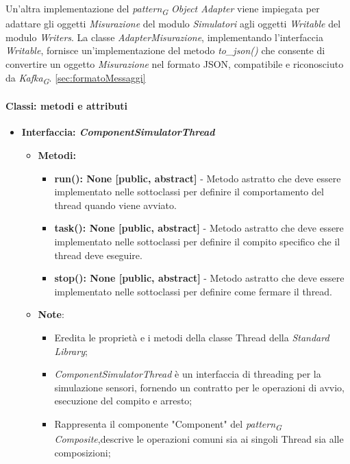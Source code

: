 \begin{itemize}
Un'altra implementazione del \textit{pattern}\textsubscript{\textit{G}} \textit{Object Adapter} viene impiegata per adattare gli oggetti \textit{Misurazione} del modulo \textit{Simulatori} agli oggetti \textit{Writable} del modulo \textit{Writers}. La classe \textit{AdapterMisurazione}, implementando l'interfaccia \textit{Writable}, fornisce un'implementazione del metodo \textit{to\_json()} che consente di convertire un oggetto \textit{Misurazione} nel formato JSON, compatibile e riconosciuto da \textit{Kafka}\textsubscript{\textit{G}}.
\ref*{sec:formatoMessaggi}


\paragraph{Classi: metodi e attributi}

\begin{itemize}
 \item{\textbf{Interfaccia: \textit{ComponentSimulatorThread}}}
    \begin{itemize}
        \item \textbf{Metodi: }
        \begin{itemize}
            \item \textbf{run(): None [public, abstract]} - Metodo astratto che deve essere implementato nelle sottoclassi per definire il comportamento del thread quando viene avviato.
            \item \textbf{task(): None [public, abstract]} - Metodo astratto che deve essere implementato nelle sottoclassi per definire il compito specifico che il thread deve eseguire.
            \item \textbf{stop(): None [public, abstract]} - Metodo astratto che deve essere implementato nelle sottoclassi per definire come fermare il thread.
        \end{itemize}
        \item\textbf{Note}:
            \begin{itemize}
                \item Eredita le proprietà e i metodi della classe Thread della \textit{Standard Library};
                \item \textit{ComponentSimulatorThread} è un interfaccia di threading per la simulazione sensori, fornendo un contratto per le operazioni di avvio, esecuzione del compito e arresto;
                \item Rappresenta il componente "Component" del \textit{pattern}\textsubscript{\textit{G}} \textit{Composite},descrive le operazioni comuni sia ai singoli Thread sia alle composizioni;

\end{itemize}
\end{itemize}
\end{itemize}
\end{itemize}
